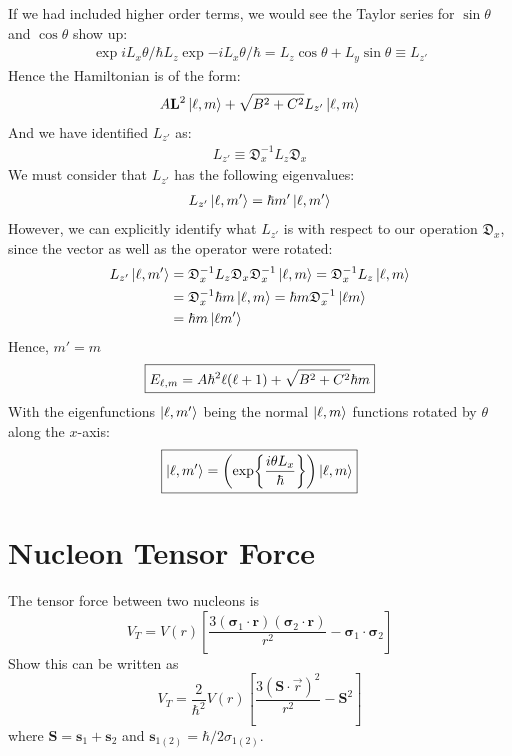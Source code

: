\documentclass[12pt]{article}
\begin{document}
If we had included higher order terms, we would see the Taylor series for $\sin\theta$ and $\cos\theta$ show up:
\begin{align*}
  \exp{iL_x\theta/\hbar} L_z \exp{-iL_x\theta/\hbar}=
  L_z\cos\theta+L_y\sin\theta\equiv L_{z'}
\end{align*}
Hence the Hamiltonian is of the form:
\begin{align*}
  A\vb{L}^2\ket{\ell,m}+\sqrt{B^2+C^2}L_{z'}\ket{\ell,m}
\end{align*}
And we have identified $L_{z'}$ as:
\begin{align*}
  L_{z'}\equiv\mathfrak{D}_x^{-1}L_z\mathfrak{D}_x
\end{align*}
We must consider that $L_{z'}$ has the following eigenvalues:
\begin{align*}
  L_{z'}\ket{\ell,m'}=\hbar m'\ket{\ell,m'}
\end{align*}
However, we can explicitly identify what $L_{z'}$ is with respect to our operation $\mathfrak{D}_x$, since the vector as well as the operator were rotated:
\begin{align*}
  L_{z'}\ket{\ell,m'}&=\mathfrak{D}_x^{-1}L_{z}\mathfrak{D}_x
  \mathfrak{D}_x^{-1}\ket{\ell,m}=\mathfrak{D}_x^{-1}L_{z}\ket{\ell,m}\\
  &=\mathfrak{D}_x^{-1}\hbar m\ket{\ell,m}=\hbar m\mathfrak{D}_x^{-1}\ket{\ell m}\\
  &=\hbar m\ket{\ell m'}
\end{align*}
Hence, $m'=m$
\begin{align}
  \boxed{E_{\ell,m}=A\hbar^2\ell(\ell+1)+\sqrt{B^2+C^2}\hbar m}
\end{align}
With the eigenfunctions $\ket{\ell,m'}$ being the normal $\ket{\ell,m}$ functions rotated by $\theta$ along the $x$-axis:
\begin{align}
  \boxed{\ket{\ell,m'}=\qty(\exp{\frac{i\theta L_x}{\hbar}})\ket{\ell,m}}
\end{align}

\newpage
\section{Nucleon Tensor Force}
\begin{problem}
  The tensor force between two nucleons is
  \[
    V_T=V(r)\left[\frac{3\left(\boldsymbol{\sigma}_1 \cdot \mathbf{r}\right)\left(\boldsymbol{\sigma}_2 \cdot \mathbf{r}\right)}{r^2}-\boldsymbol{\sigma}_1 \cdot \boldsymbol{\sigma}_2\right]
  \]
  Show this can be written as
  \[
    V_T=\frac{2}{\hbar^2} V(r)\left[\frac{3(\mathbf{S} \cdot \vec{r})^2}{r^2}-\mathbf{S}^2\right]
  \]
  where $\mathbf{S}=\mathbf{s}_1+\mathbf{s}_2$ and $\mathbf{s}_{1(2)}=\hbar / 2 \sigma_{1(2)}$.
\end{problem}
\end{document}
